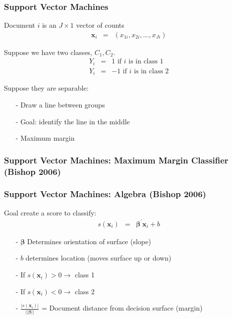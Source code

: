 \documentclass{beamer}
\begin{document}
\begin{frame}
\frametitle{Support Vector Machines} 

Document $i$ is an $J \times 1$ vector of counts
\begin{eqnarray}
\boldsymbol{x}_i & = & (x_{1i}, x_{2i}, \hdots, x_{Ji} ) \nonumber 
\end{eqnarray}

Suppose we have \alert{two} classes, $C_1, C_2$.  
\begin{eqnarray}
Y_i & = & 1 \text{ if $i$ is in class 1} \nonumber \\
Y_i & = & -1 \text{ if $i$ is in class 2} \nonumber 
\end{eqnarray}



Suppose they are \alert{separable}: 
\begin{itemize} 
\item[-] Draw a line between groups
\item[-] Goal: identify the line \alert{in the middle} 
\item[-] \alert{Maximum margin} 
\end{itemize}



\end{frame}


\begin{frame}
\frametitle{Support Vector Machines: Maximum Margin Classifier (Bishop 2006)} 




\end{frame}

\begin{frame}
\frametitle{Support Vector Machines: Algebra (Bishop 2006) } 

Goal create a score to classify: 
\begin{eqnarray}
s(\boldsymbol{x}_i) & = & \boldsymbol{\beta}^{'} \boldsymbol{x}_i + b \nonumber 
\end{eqnarray} 



\begin{itemize}
\item[-] $\boldsymbol{\beta} $ Determines orientation of surface (slope) 
\item[-] $b$ determines location (moves surface up or down)
\item[-] If $s(\boldsymbol{x}_i) > 0 \rightarrow $ class 1
\item[-] If $s(\boldsymbol{x}_i ) < 0 \rightarrow $ class 2 
\item[-] $\frac{| s(\boldsymbol{x}_i) | } {|| \boldsymbol{\beta} || } $ = Document distance from decision surface  (margin) 
\end{itemize}


\end{frame}
\end{document}
